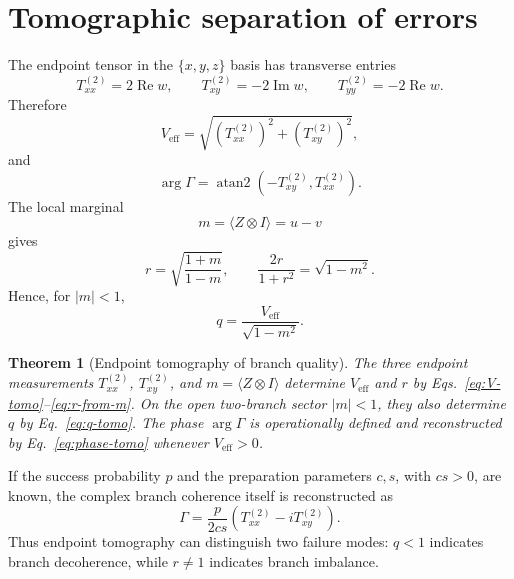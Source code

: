 \documentclass[reprint,aps,pra,superscriptaddress,nofootinbib,longbibliography]{revtex4-2}
\newtheorem{theorem}{Theorem}
\newcommand{\Repart}{\operatorname{Re}}
\newcommand{\Impart}{\operatorname{Im}}
\newcommand{\Veff}{V_{\mathrm{eff}}}
\begin{document}
\section{Tomographic separation of errors}

The endpoint tensor in the \(\{x,y,z\}\) basis has transverse entries
\begin{equation}
T^{(2)}_{xx}=2\Repart w,
\qquad
T^{(2)}_{xy}=-2\Impart w,
\qquad
T^{(2)}_{yy}=-2\Repart w.
\end{equation}
Therefore
\begin{equation}
\Veff=
\sqrt{(T^{(2)}_{xx})^2+(T^{(2)}_{xy})^2},
\label{eq:V-tomo}
\end{equation}
and
\begin{equation}
\arg\Gamma=\operatorname{atan2}(-T^{(2)}_{xy},T^{(2)}_{xx}).
\label{eq:phase-tomo}
\end{equation}
The local marginal
\begin{equation}
m=\langle Z\otimes I\rangle=u-v
\label{eq:m-def}
\end{equation}
gives
\begin{equation}
r=\sqrt{\frac{1+m}{1-m}},
\qquad
\frac{2r}{1+r^2}=\sqrt{1-m^2}.
\label{eq:r-from-m}
\end{equation}
Hence, for \(|m|<1\),
\begin{equation}
q=\frac{\Veff}{\sqrt{1-m^2}}.
\label{eq:q-tomo}
\end{equation}

\begin{theorem}[Endpoint tomography of branch quality]
The three endpoint measurements \(T^{(2)}_{xx}\), \(T^{(2)}_{xy}\), and \(m=\langle Z\otimes I\rangle\) determine \(\Veff\) and \(r\) by Eqs.~\eqref{eq:V-tomo}--\eqref{eq:r-from-m}.  On the open two-branch sector \(|m|<1\), they also determine \(q\) by Eq.~\eqref{eq:q-tomo}.  The phase \(\arg\Gamma\) is operationally defined and reconstructed by Eq.~\eqref{eq:phase-tomo} whenever \(\Veff>0\).
\end{theorem}

If the success probability \(p\) and the preparation parameters \(c,s\), with \(cs>0\), are known, the complex branch coherence itself is reconstructed as
\begin{equation}
\Gamma=\frac{p}{2cs}
\left(T^{(2)}_{xx}-iT^{(2)}_{xy}\right).
\label{eq:Gamma-reconstruct}
\end{equation}
Thus endpoint tomography can distinguish two failure modes: \(q<1\) indicates branch decoherence, while \(r\ne1\) indicates branch imbalance.
\end{document}
